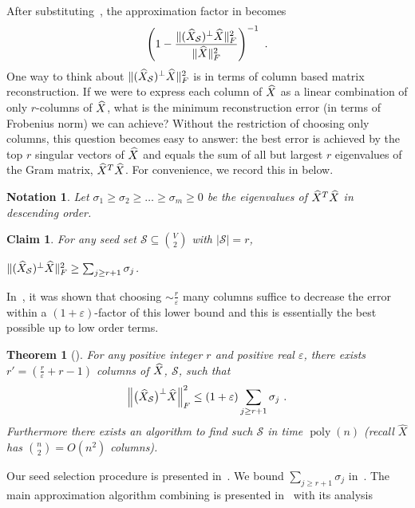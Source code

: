 \documentclass{article}
\let\eps=\varepsilon
\newtheorem{theorem}{Theorem}[section]
\newtheorem{claim}{Claim}[section]
\newtheorem{notation}{Notation}[section]
\DeclareMathOperator{\poly}{poly}
\newcounter{alg-count}
\newcommand{\vnote}[1]{}
\newcommand{\aknote}[1]{}
\newcommand{\sde}{{\mathcal{S}}}
\begin{document}
After substituting~, the approximation factor in
 becomes
\[ \left(1 - \frac{\|{(\widehat{\xmat}_{\sde})^{\perp}}\widehat{\xmat}
    \|^2_F}{\|\widehat{\xmat}\|^2_F}\right)^{-1} \ .
\]
One way to think about
$\|{(\widehat{\xmat}_{\sde})^{\perp}}\widehat{\xmat} \|^2_F$ is in
terms of column based matrix reconstruction. If we were to express
each column of $\widehat{{X}}$ as a linear combination of only
$r$-columns of $\widehat{{X}}$, what is the minimum reconstruction
error (in terms of Frobenius norm) we can achieve?
Without the restriction of choosing only columns, this question
becomes easy to answer: the best error is achieved by the top $r$
singular vectors of $\widehat{{X}}$ and equals the sum of all but
largest $r$ eigenvalues of the Gram matrix, $\widehat{{X}}^T
\widehat{{X}}$. For convenience, we record this in
 below.
\begin{notation}
  Let $\sigma_1 \ge \sigma_2 \ge \ldots \ge \sigma_m \ge 0$ be the
  eigenvalues of $\widehat{{X}}^T \widehat{{X}}$ in descending
  order.
\end{notation}
\begin{claim}
  \label{lem:col-res-lb}
  For any seed set $\sde\subseteq \binom{V}{2}$ with $|\sde|=r$,
  \vnote{Changed $|\sde|=r-1$ to $r$.}
$ \|{(\widehat{\xmat}_{\sde})^{\perp}}\widehat{\xmat} \|^2_F \ge
  \sum_{j\ge r+1} \sigma_j $.
\end{claim}
\aknote{Happily removed the proof :).}
In~\cite{gs11-svd}, it was shown that choosing $\sim \frac{r}{\eps}$
many columns suffice to decrease the error within a $(1+\eps)$-factor
of this lower bound and this is essentially the best possible up to
low order terms.
\begin{theorem}[\cite{gs11-svd}] \label{thm:choose-s} For any positive
  integer $r$ and positive real $\eps$, there exists $r' =
  \left(\frac{r}{\eps}+r-1\right)$ columns of $\widehat{{X}}$,
  $\sde$, such that
	\[
        \left\| \big(\widehat{\xmat}_{\sde}\big)^{\perp}
          \widehat{\xmat}\right\|^2_F \le \left( 1 + \eps \right)
        \sum_{j\ge r+1} \sigma_j \ .
        \]
  Furthermore there exists an algorithm to find such $\sde$ in
  time $\poly(n)$ (recall $\widehat{X}$ has $\binom{n}{2} =
  O(n^2)$ columns).
\end{theorem}
Our seed selection procedure is presented in~.  We
bound $\sum_{j\ge r+1} \sigma_j$ in~. The main
approximation algorithm combining 
is presented in~ with its analysis
\end{document}

